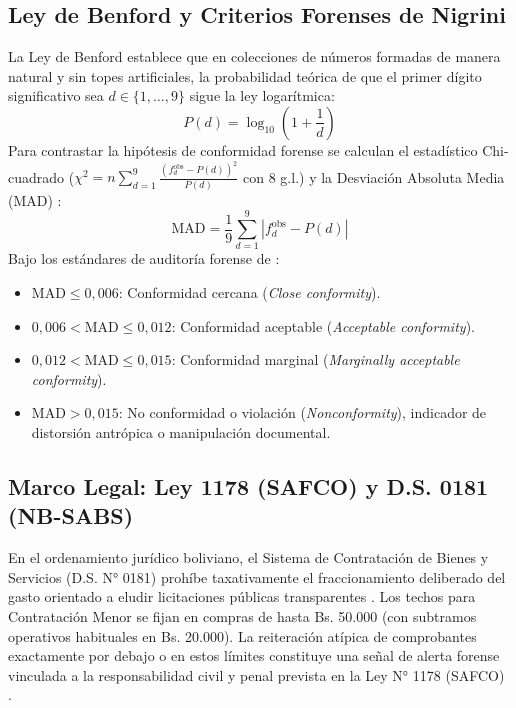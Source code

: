\documentclass[11pt,a4paper]{article}
\begin{document}
\subsection{Ley de Benford y Criterios Forenses de Nigrini}
La Ley de Benford \citep{benford1938law} establece que en colecciones de números formadas de manera natural y sin topes artificiales, la probabilidad teórica de que el primer dígito significativo sea $d \in \{1, \dots, 9\}$ sigue la ley logarítmica:
\begin{equation}
    P(d) = \log_{10}\left(1 + \frac{1}{d}\right)
\end{equation}
Para contrastar la hipótesis de conformidad forense se calculan el estadístico Chi-cuadrado ($\chi^2 = n \sum_{d=1}^9 \frac{(f_d^{\text{obs}} - P(d))^2}{P(d)}$ con 8 g.l.) y la Desviación Absoluta Media (MAD) \citep{nigrini2012benford}:
\begin{equation}
    \text{MAD} = \frac{1}{9} \sum_{d=1}^9 \left| f_d^{\text{obs}} - P(d) \right|
\end{equation}
Bajo los estándares de auditoría forense de \citet{nigrini2012benford}:
\begin{itemize}[noitemsep]
    \item $\text{MAD} \le 0,006$: Conformidad cercana (\textit{Close conformity}).
    \item $0,006 < \text{MAD} \le 0,012$: Conformidad aceptable (\textit{Acceptable conformity}).
    \item $0,012 < \text{MAD} \le 0,015$: Conformidad marginal (\textit{Marginally acceptable conformity}).
    \item $\text{MAD} > 0,015$: No conformidad o violación (\textit{Nonconformity}), indicador de distorsión antrópica o manipulación documental.
\end{itemize}

\subsection{Marco Legal: Ley 1178 (SAFCO) y D.S. 0181 (NB-SABS)}
En el ordenamiento jurídico boliviano, el Sistema de Contratación de Bienes y Servicios (D.S. N° 0181) prohíbe taxativamente el fraccionamiento deliberado del gasto orientado a eludir licitaciones públicas transparentes \citep{ds0181}. Los techos para Contratación Menor se fijan en compras de hasta Bs. 50.000 (con subtramos operativos habituales en Bs. 20.000). La reiteración atípica de comprobantes exactamente por debajo o en estos límites constituye una señal de alerta forense vinculada a la responsabilidad civil y penal prevista en la Ley N° 1178 (SAFCO) \citep{ley1178safco}.
\end{document}
